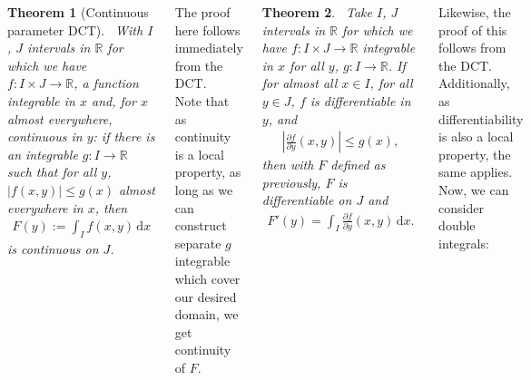 \documentclass{tikzposter} %
\newtheorem{theorem}{Theorem}
\begin{document}
\begin{columns}
{      \begin{theorem}[Continuous parameter DCT]
        \ With $I$, $J$ intervals in $\mathbb{R}$ for which we have $f : I \times J \to \mathbb{R}$, a function integrable in $x$ and, for $x$ almost everywhere, continuous in $y$: if there is an integrable $g : I \to \mathbb{R}$ such that for all $y$, $|f(x,y)| \le g(x)$ almost everywhere in $x$, then
        \begin{align*}
          F(y) := \int_{I} f(x,y) \, \mathrm{d}x
        \end{align*}
        is continuous on $J$.
      \end{theorem}
      \hphantom{}

      The proof here follows immediately from the DCT. \\

      Note that as continuity is a local property, as long as we can construct separate $g$ integrable which cover our desired domain, we get continuity of $F$. \\

      \begin{theorem}
        \ Take $I$, $J$ intervals in $\mathbb{R}$ for which we have $f : I \times J \to \mathbb{R}$ integrable in $x$ for all $y$, $g : I \to \mathbb{R}$. If for almost all $x \in I$, for all $y \in J$, $f$ is differentiable in $y$, and
        \begin{align*}
          \left| \frac{\partial f}{\partial y}(x,y)\right| \le g(x),
        \end{align*}
        then with $F$ defined as previously, $F$ is differentiable on $J$ and
        \begin{align*}
          F'(y) = \int_{I} \frac{\partial f}{\partial y} (x,y) \, \mathrm{d}x.
        \end{align*}
      \end{theorem}
      \hphantom{}

      Likewise, the proof of this follows from the DCT. Additionally, as differentiability is also a local property, the same applies. \\

      Now, we can consider double integrals: \\

}
\end{columns}
\end{document}

